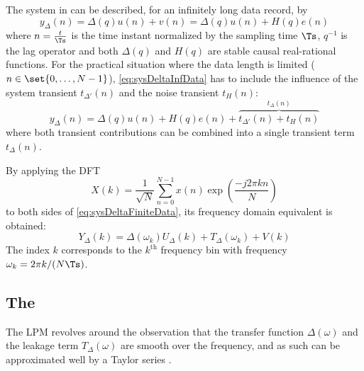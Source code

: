 The system in  can be described, for an infinitely long data record, by
\begin{equation}
  y_{\Delta}(n) = \Delta(q)u(n) + v(n) = \Delta(q)u(n) + H(q)e(n)
  \label{eq:sysDeltaInfData}
\end{equation}
where $n = \frac{t}{\Ts}$ is the time instant normalized by the sampling time $\Ts$, $q^{-1}$ is the lag operator and both $\Delta(q)$ and $H(q)$ are stable causal real-rational functions.
For the practical situation where the data length is limited ($n \in \set{0,\ldots,N-1}$), \eqref{eq:sysDeltaInfData} has to include the influence of the system transient $t_{\Delta'}(n)$ and the noise transient $t_{H}(n)$:
\begin{equation}
    y_{\Delta}(n) = \Delta(q)u(n) + H(q)e(n) + \overbrace{t_{\Delta'}(n) + t_{H}(n)}^{t_{\Delta}(n)}
    \label{eq:sysDeltaFiniteData}
\end{equation}
where both transient contributions can be combined into a single transient term $t_{\Delta}(n)$.

By applying the \gls{DFT}
\begin{equation}
  X(k) = \frac{1}{\sqrt{N}} \sum_{n=0}^{N-1} x(n) \exp \left( \frac{- j 2 \pi k n }{N} \right)
  \label{eq:DFT}
\end{equation} 
to both sides of \eqref{eq:sysDeltaFiniteData}, its frequency domain equivalent is obtained:
\begin{equation}
  Y_{\Delta}(k) = \Delta(\omega_k) U_{\Delta}(k) + T_{\Delta}(\omega_k) + V(k)
  \label{eq:sysDeltaFiniteDataFD}
\end{equation}
The index $k$ corresponds to the $k^{\text{th}}$ frequency bin with frequency $\omega_{k} = 2\pi k / (N \Ts)$.

\subsection{The }
\label{sec:LPM}
The \gls{LPM} revolves around the observation that the transfer function $\Delta(\omega)$ and the leakage term $T_{\Delta}(\omega)$ are smooth over the frequency, and as such can be approximated well by a Taylor series \citep{Schoukens2009LPM}.


